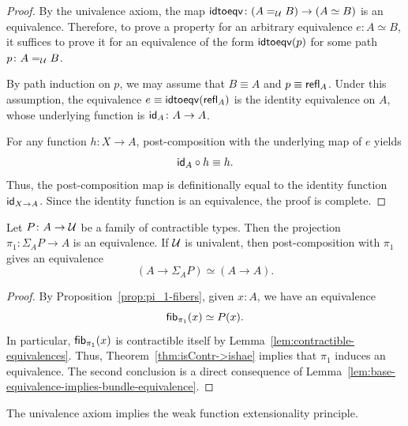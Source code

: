\begin{proof}
    By the univalence axiom, the map $\fun{idtoeqv}\colon(A\eq{\univ}B)\to(A\simeq B)$ is an equivalence. Therefore, to prove a property for an arbitrary equivalence $e\colon A\simeq B$, it suffices to prove it for an equivalence of the form $\mathsf{idtoeqv}(p)$ for some path $p\colon A\eq{\univ}B$. 
    
    By path induction on $p$, we may assume that $B\equiv A$ and $p\equiv\mathsf{refl}_A$. Under this assumption, the equivalence $e\equiv\mathsf{idtoeqv}(\mathsf{refl}_A)$ is the identity equivalence on $A$, whose underlying function is $\id_A\colon A\to A$. 
    
    For any function $h\colon X\to A$, post-composition with the underlying map of $e$ yields
    \[
        \mathsf{id}_A\circ h\equiv h.
    \]
    Thus, the post-composition map is definitionally equal to the identity function $\mathsf{id}_{X\to A}$. Since the identity function is an equivalence, the proof is complete.
    
\end{proof}

\begin{prop}\ua\label{prop:projection-equivalence}
    Let\/ $P\colon A\to\univ$ be a family of contractible types. Then the projection\/ $\pi_1\colon\Sigma_AP\to A$ is an equivalence. If\/ $\mathcal U$ is univalent, then post-composition with\/ $\pi_1$ gives an equivalence
    \[
        (A\to\Sigma_AP)\simeq(A\to A).
    \]
\end{prop}

\begin{proof}
    By Proposition~\ref{prop:pi_1-fibers}, given $x\colon A$, we have an equivalence
    \[
        \mathsf{fib}_{\pi_1}(x)\simeq P(x).
    \]
    In particular, $\mathsf{fib}_{\pi_1}(x)$ is contractible itself by Lemma~\ref{lem:contractible-equivalences}. Thus, Theorem~\ref{thm:isContr->ishae} implies that $\pi_1$ induces an equivalence. The second conclusion is a direct consequence of Lemma~\ref{lem:base-equivalence-implies-bundle-equivalence}.
\end{proof}

\begin{thm}\ua\label{thm:univalence-implies-weak-funext}
    The univalence axiom implies the weak function extensionality principle.
\end{thm}

